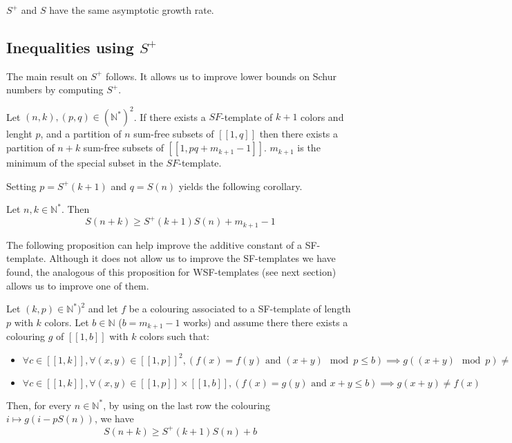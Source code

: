 \begin{remark}
	\(S^+\) and \(S\) have the same asymptotic growth rate.
\end{remark}


\subsection{Inequalities using \(S^+\)}

The main result on \(S^+\) follows. It allows us to improve lower bounds on Schur numbers by computing \(S^+\).

\begin{theorem}
	Let \((n,k), (p,q) \in (\mathbb{N}^*)^2\). If there exists a \(SF\)-template of \(k+1\) colors and lenght \(p\),
	and a partition of \(n\) sum-free subsets of \([\![1,q]\!]\) then there exists a partition of \(n+k\) sum-free subsets
	of \([\![1,pq+m_{k+1}-1]\!]\). \(m_{k+1}\) is the minimum of the special subset in the \(SF\)-template.
\end{theorem}

Setting \(p = S^+(k+1)\) and \(q = S(n)\) yields the following corollary.

\begin{corollary}
	Let \(n, k \in \mathbb{N}^*\). Then
	\[ S(n+k) \geqslant S^+(k+1)S(n) + m_{k+1} - 1 \]
\end{corollary}

\begin{remark}
The following proposition can help improve the additive constant of a SF-template. Although it does not allow us to improve the SF-templates 
we have found, the analogous of this proposition for WSF-templates (see next section) allows us to improve one of them.
\end{remark}

\begin{proposition}
Let \((k, p) \in \mathbb{N}^*)^2\) and let \(f\) be a colouring associated to a SF-template of length \(p\) with \(k\) colors. Let 
\(b \in \mathbb{N}\) (\(b = m_{k+1} - 1\) works) and assume there there exists a colouring \(g\) of \([\![1, b]\!]\) with \(k\) colors such that:
\begin{itemize}
	\item \(\forall c \in [\![1, k]\!], \forall (x, y) \in [\![1, p]\!]^2,(f(x) = f(y) \text{ and } (x + y) \mod p \leqslant b) 
	\implies g((x + y) \mod p) \neq f(x)\)
	\item \(\forall c \in [\![1, k]\!], \forall (x, y) \in [\![1, p]\!] \times  [\![1, b]\!], (f(x) = g(y) \text{ and } x + y \leqslant b) 
	\implies g(x + y) \neq f(x)\)
\end{itemize}
Then, for every \(n \in \mathbb{N}^*\), by using on the last row the colouring \(i \longmapsto g(i - p S(n))\), we have\\
\[ S(n+k) \geqslant S^+(k+1)S(n) + b\]
\end{proposition}

